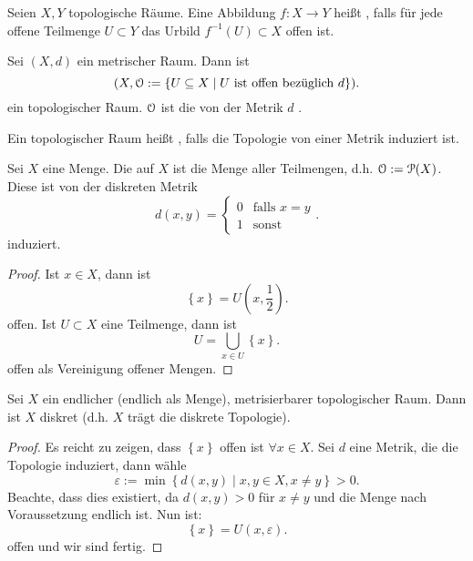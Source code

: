 \begin{definition}
    Seien $X,Y$ topologische Räume. Eine Abbildung  $f:X \to  Y$ heißt , falls für jede offene Teilmenge $U\subset Y$ das Urbild $f^{-1}(U) \subset X$ offen ist.
\end{definition}

\begin{example}
    Sei $(X,d)$ ein metrischer Raum. Dann ist
     \[
         (X, \mathcal{O} := \left \{U\subseteq X \mid  U \text{ ist offen bezüglich $d$}\right\} )
    .\] 
    ein topologischer Raum. $\mathcal{O}$ ist die von der Metrik  $d$ .
\end{example}
\begin{definition}
    Ein topologischer Raum heißt , falls die Topologie von einer Metrik induziert ist.
\end{definition}

\begin{example}
    Sei $X$ eine Menge. Die  auf $X$ ist die Menge aller Teilmengen, d.h.  $\mathcal{O} := \mathcal{P}(X)$. Diese ist von der diskreten Metrik
    \[
        d(x,y) = \begin{cases}
            0 & \text{falls }x=y \\
            1 & \text{sonst}
        \end{cases}
    .\] 
    induziert.
\end{example}
\begin{proof}
    Ist $x\in X$, dann ist
    \[
        \left \{x\right\} =U\left(x,\frac{1}{2}\right)
    .\] 
    offen. Ist $U\subset X$ eine Teilmenge, dann ist
    \[
    U = \bigcup_{x\in U} \left \{x\right\}
    .\] 
    offen als Vereinigung offener Mengen.
\end{proof}

\begin{theorem}
    Sei $X$ ein endlicher (endlich als Menge), metrisierbarer topologischer Raum. Dann ist  $X$ diskret (d.h. $X$ trägt die diskrete Topologie).
\end{theorem}
\begin{proof}
    Es reicht zu zeigen, dass $\left \{x\right\} $ offen ist $\forall x\in X$. Sei $d$ eine Metrik, die die Topologie induziert, dann wähle
     \[
         ε := \min \left \{d(x,y) \mid  x,y\in X , x\neq y\right\} > 0
    .\] 
    Beachte, dass dies existiert, da $d(x,y) >0$ für  $x\neq y$ und die Menge nach Voraussetzung endlich ist. Nun ist:
    \[
    \left \{x\right\}  = U(x,ε)
    .\] 
    offen und wir sind fertig.
\end{proof}

